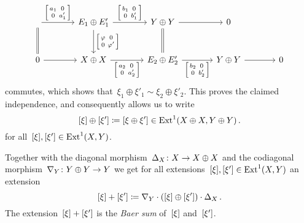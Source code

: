 \begin{remarkdefinition}
\[\begin{tikzcd}[column sep = large, row sep = large, ampersand replacement = \&]
          \arrow{r}[above]{ \begin{bsmallmatrix} a_1 & 0 \\ 0 & a'_1 \end{bsmallmatrix} }
          \arrow[equal]{d}
      \&  E_1 \oplus E'_1
          \arrow{r}[above]{ \begin{bsmallmatrix} b_1 & 0 \\ 0 & b'_1 \end{bsmallmatrix} }
          \arrow{d}[right]{ \begin{bsmallmatrix} \varphi & 0 \\ 0 & \varphi' \end{bsmallmatrix} }
      \&  Y \oplus Y
          \arrow{r}
          \arrow[equal]{d}
      \&  0
      \\
          0
          \arrow{r}
      \&  X \oplus X
          \arrow{r}[below]{ \begin{bsmallmatrix} a_2 & 0 \\ 0 & a'_2 \end{bsmallmatrix} }
      \&  E_2 \oplus E'_2
          \arrow{r}[below]{ \begin{bsmallmatrix} b_2 & 0 \\ 0 & b'_2 \end{bsmallmatrix} }
      \&  Y \oplus Y
          \arrow{r}
      \&  0
    \end{tikzcd}
  \]
  commutes, which shows that~$\xi_1 \oplus \xi'_1 \sim \xi_2 \oplus \xi'_2$.
  This proves the claimed independence, and consequently allows us to write
  \[
    [\xi] \oplus [\xi']
    \coloneqq
    [\xi \oplus \xi']
    \in
    \operatorname{Ext}^1(X \oplus X, Y \oplus Y)  \,.
  \]
  for all~$[\xi], [\xi'] \in \operatorname{Ext}^1(X,Y)$.
  
  Together with the diagonal morphism~$\Delta_X \colon X \to X \oplus X$ and the codiagonal morphism~$\nabla_Y \colon Y \oplus Y \to Y$ we get for all extensions~$[\xi], [\xi'] \in \operatorname{Ext}^1(X,Y)$ an extension
  \[
    [\xi] + [\xi']
    \coloneqq
    \nabla_Y \cdot ( [\xi] \oplus [\xi'] ) \cdot \Delta_X \,.
  \]
  The extension~$[\xi] + [\xi']$ is the \emph{Baer sum} of~$[\xi]$ and~$[\xi']$.
\end{remarkdefinition}


